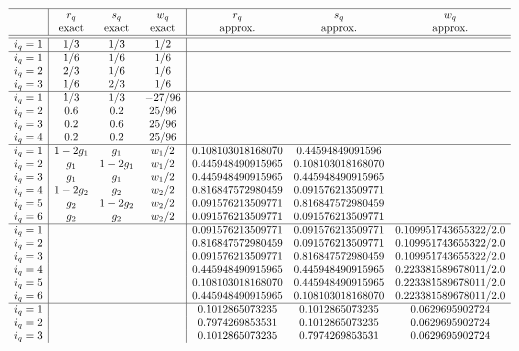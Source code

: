 {\small
\[
\begin{array}{c|ccc|ccc}
\hline
&r_q & s_q & w_q &r_q & s_q & w_q \\ 
&\text{exact} & \text{exact} & \text{exact} & \text{approx.}& \text{approx.}& \text{approx.}\\
\hline\hline
i_q=1& 1/3 & 1/3 & 1/2\\
\hline
i_q=1 & 1/6 & 1/6 & 1/6 \\
i_q=2 & 2/3 & 1/6 & 1/6 \\
i_q=3 & 1/6 & 2/3 & 1/6 \\
\hline
i_q=1&1/3 & 1/3 & -27/96\\
i_q=2&0.6 & 0.2 &  25/96\\
i_q=3&0.2 & 0.6 &  25/96\\
i_q=4&0.2 & 0.2 &  25/96\\
\hline
i_q=1& 1-2g_1 & g_1 & w_1/2  &  0.108103018168070 & 0.44594849091596  &   \\
i_q=2& g_1 & 1-2g_1 & w_1/2  &  0.445948490915965 & 0.108103018168070 &   \\
i_q=3& g_1 & g_1    & w_1/2  &  0.445948490915965 & 0.445948490915965 &   \\
i_q=4& 1-2g_2 & g_2 & w_2/2  &  0.816847572980459 & 0.091576213509771 &   \\
i_q=5& g_2 & 1-2g_2 & w_2/2  &  0.091576213509771 & 0.816847572980459 &   \\
i_q=6& g_2 & g_2    & w_2/2  &  0.091576213509771 & 0.091576213509771 &   \\
\hline
i_q=1&&&&0.091576213509771 &  0.091576213509771    &    0.109951743655322/2.0 \\ 
i_q=2&&&&0.816847572980459 &  0.091576213509771    &    0.109951743655322/2.0 \\
i_q=3&&&&0.091576213509771 &  0.816847572980459    &    0.109951743655322/2.0 \\
i_q=4&&&&0.445948490915965 &  0.445948490915965    &    0.223381589678011/2.0 \\
i_q=5&&&&0.108103018168070 &  0.445948490915965    &    0.223381589678011/2.0 \\
i_q=6&&&&0.445948490915965 &  0.108103018168070    &    0.223381589678011/2.0 \\
\hline
i_q=1 &&&&0.1012865073235 &  0.1012865073235  &     0.0629695902724 \\
i_q=2 &&&&0.7974269853531 &  0.1012865073235  &     0.0629695902724 \\
i_q=3 &&&&0.1012865073235 &  0.7974269853531  &     0.0629695902724 \\

\end{array}\]}
